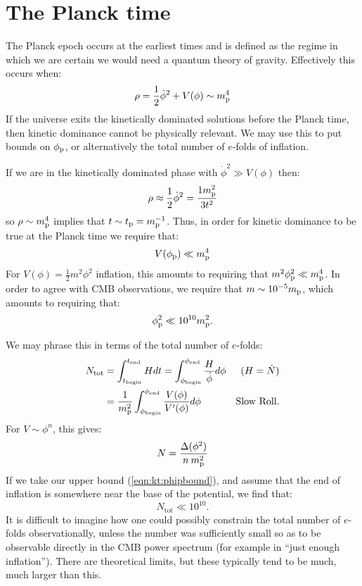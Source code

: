 \section{The Planck time}
The Planck epoch occurs at the earliest times and is defined as the
regime in which we are certain we would need a quantum theory of
gravity. Effectively this occurs when:
\begin{equation}
  \rho = \frac{1}{2}\dot\phi^2 + V(\phi)  \sim m_{\mathrm{p}}^4
  \label{eqn:kt:rhosim}
\end{equation}
If the universe exits the kinetically dominated solutions before the
Planck time, then kinetic dominance cannot be physically relevant. We
may use this to put bounds on $\phi_{\mathrm{p}}$, or alternatively the total
number of $e$-folds of inflation.

If we are in the kinetically dominated phase with $\dot{\phi}^2\gg
V(\phi)$ then:
\begin{equation}
              \rho \approx \frac{1}{2}\dot\phi^2= \frac{1m_{\mathrm{p}}^2}{3t^2} 
  \label{eqn:kt:rhop}
\end{equation}
so $\rho\sim m_{\mathrm{p}}^4$ implies that $t\sim t_{\mathrm{p}}=m_{\mathrm{p}}^{-1}$. Thus, in order for
kinetic dominance to be true at the Planck time we require that:
\begin{equation}
  V(\phi_{\mathrm{p}}) \ll m_{\mathrm{p}}^4
\end{equation}
For $V(\phi) = \frac{1}{2}m^2\phi^2$ inflation, this amounts to requiring that $m^2\phi_{\mathrm{p}}^2\ll m_{\mathrm{p}}^4$. In order to agree with CMB observations, we require
that $m\sim10^{-5}m_{\mathrm{p}}$, which amounts to requiring that:
\begin{equation}
 \phi_{\mathrm{p}}^2 \ll 10^{10}m_{\mathrm{p}}^2 \nonumber.
 \label{eqn:kt:phipbound}
\end{equation}

We may phrase this in terms of the total number of $e$-folds:
\begin{align}
  N_\mathrm{tot} 
  &=\int_{t_\mathrm{begin}}^{t_\mathrm{end}} H dt 
  =\int_{\phi_\mathrm{begin}}^{\phi_\mathrm{end}} 
       \frac{H}{\dot{\phi}}d\phi  &\text{($H=\dot{N}$)}
  \\
  &=\frac{1}{m_{\mathrm{p}}^2}\int_{\phi_\mathrm{begin}}^{\phi_\mathrm{end}}
     {\frac{V(\phi)}{V^\prime(\phi)}}d\phi &\text{Slow Roll.}
\end{align}
For $V\sim\phi^n$, this gives:
\begin{equation}
  N = \frac{\Delta (\phi^2) }{n\:m_{\mathrm{p}}^2}
\end{equation}
If we take our upper bound (\ref{eqn:kt:phipbound}), and assume that the
end of inflation is somewhere near the base of the potential, we find
that: 
\begin{equation}
  N_\mathrm{tot}\ll 10^{10}.
\end{equation}
It is difficult to imagine how one could possibly constrain the total
number of $e$-folds observationally, unless the number was
sufficiently small so as to be observable directly in the CMB power
spectrum (for example in ``just enough inflation''). There are
theoretical limits, but these typically tend to be much, much larger
than this.

